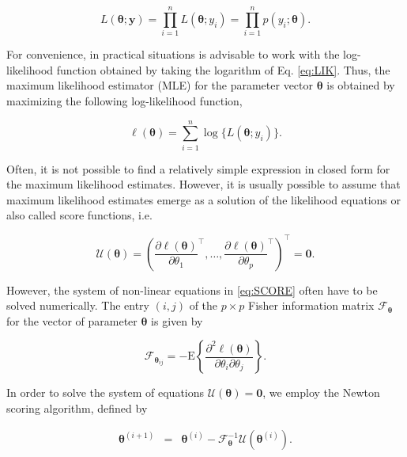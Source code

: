 \documentclass[9pt,a5paper,]{book}
\theoremstyle{definition}
\theoremstyle{definition}
\theoremstyle{remark}
\begin{document}
\begin{equation}
L(\boldsymbol{\theta};\boldsymbol{y}) = \prod_{i=1}^n L(\boldsymbol{\theta}; y_i) = \prod_{i=1}^n p(y_i; \boldsymbol{\theta}).
\label{eq:LIK}
\end{equation}

For convenience, in practical situations is advisable to work with the
log-likelihood function obtained by taking the logarithm of Eq.
\eqref{eq:LIK}. Thus, the maximum likelihood estimator (MLE) for the
parameter vector \(\boldsymbol{\theta}\) is obtained by maximizing the
following log-likelihood function,

\begin{equation}
\ell(\boldsymbol{\theta})=\sum^n_{i=1} \log\{ L(\boldsymbol{\theta}; y_i) \}.
\label{eq:LOGLIK}
\end{equation}

Often, it is not possible to find a relatively simple expression in
closed form for the maximum likelihood estimates. However, it is usually
possible to assume that maximum likelihood estimates emerge as a
solution of the likelihood equations or also called score functions,
i.e.

\begin{equation}
\mathcal{U}(\boldsymbol{\theta}) = \left ( \frac{\partial \ell(\boldsymbol{\theta})}{\partial \theta_1}^\top, \ldots, \frac{\partial \ell(\boldsymbol{\theta})}{\partial \theta_p}^\top \right )^\top = \boldsymbol{0}.
\label{eq:SCORE}
\end{equation}

However, the system of non-linear equations in \eqref{eq:SCORE} often have
to be solved numerically. The entry \((i,j)\) of the \(p \times p\)
Fisher information matrix \(\mathcal{F}_{\boldsymbol{\theta}}\) for the
vector of parameter \(\boldsymbol{\theta}\) is given by

\begin{equation}
\mathcal{F}_{\boldsymbol{\theta}_{ij}} =-\mathrm{E} \left \{ \frac{\partial^2 \ell(\boldsymbol{\theta})}{\partial\theta_i\partial\theta_j} \right \}.
\end{equation}

In order to solve the system of equations
\(\mathcal{U}(\boldsymbol{\theta}) = \boldsymbol{0}\), we employ the
Newton scoring algorithm, defined by

\begin{eqnarray}
\boldsymbol{\theta}^{(i+1)} &=& \boldsymbol{\theta}^{(i)} - \mathcal{F}_{\boldsymbol{\theta}}^{-1} \mathcal{U}(\boldsymbol{\theta}^{(i)}).
\end{eqnarray}
\end{document}
